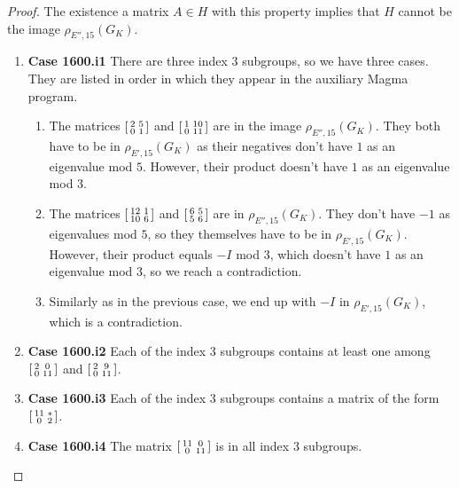 \documentclass[10pt,leqno]{amsart}
\newcommand\sm[1]{\begin{bsmallmatrix}#1\end{bsmallmatrix}}
\theoremstyle{definition}
\theoremstyle{remark}
\numberwithin{theorem}{section}
\begin{document}
\begin{proof}
The existence a matrix $A \in H$ with this property implies that $H$ cannot be the image $\rho_{E'', 15}(G_K)$.

\begin{enumerate}
    \item \textbf{Case 1600.i1} There are three index $3$ subgroups, so we have three cases. They are listed in order in which they appear in the auxiliary Magma program.
    \begin{enumerate}
        \item The matrices $\sm{2 & 5 \\ 0 & 1}$ and $\sm{1 & 10 \\ 0 & 11}$ are in the image $\rho_{E'', 15}(G_K)$. They both have to be in $\rho_{E', 15}(G_K)$ as their negatives don't have $1$ as an eigenvalue mod $5$. However, their product doesn't have $1$ as an eigenvalue mod $3$. 
        \item The matrices $\sm{12 & 1 \\ 10 & 6}$ and $\sm{6 & 5 \\ 5 & 6}$ are in $\rho_{E'', 15}(G_K)$. They don't have $-1$ as eigenvalues mod $5$, so they themselves have to be in $\rho_{E', 15}(G_K)$. However, their product equals $-I$ mod $3$, which doesn't have $1$ as an eigenvalue mod $3$, so we reach a contradiction. 
        \item Similarly as in the previous case, we end up with $-I$ in $\rho_{E', 15}(G_K)$, which is a contradiction.
    \end{enumerate}
    
    \item \textbf{Case 1600.i2}
    Each of the index $3$ subgroups contains at least one among $\sm{2 & 0 \\ 0 & 11}$ and $\sm{2 & 9 \\ 0 & 11}$. 
    \item \textbf{Case 1600.i3} Each of the index $3$ subgroups contains a matrix of the form $\sm{11 & * \\ 0 & 2}$.
    \item \textbf{Case 1600.i4} The matrix $\sm{11 & 0 \\ 0 & 11}$ is in all index $3$ subgroups.
\end{enumerate}
\end{proof}
\end{document}
